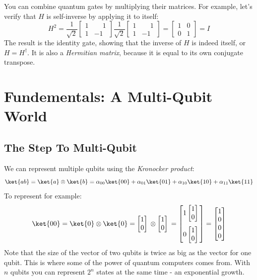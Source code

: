 \documentclass[11pt]{article}
\newcommand{\igate}{
  \begin{bmatrix}
  1 & 0 \\
  0 & 1 
  \end{bmatrix}
}
\newcommand{\hgate}{
  \dfrac{1}{\sqrt2}
  \begin{bmatrix}
  1 & \phantom{-}1 \\
  1 & -1
  \end{bmatrix}
}
\newcommand{\qstatezero}{
  \begin{bmatrix}1 \\ 0\end{bmatrix}
}
\begin{document}
You can combine quantum gates by multiplying their matrices. For example, let's verify that $H$ is self-inverse by applying it to itself:
\[
  H^2 = \hgate{} \hgate{} = \igate{} = I
\]
The result is the identity gate, showing that the inverse of $H$ is indeed itself, or $H = H^\dagger$. It is also a \emph{Hermitian matrix}, because it is equal to its own conjugate transpose.

\newpage

\section{Fundementals: A Multi-Qubit World}
\subsection{The Step To Multi-Qubit}
We can represent multiple qubits using the \emph{Kronocker product}:
\[
  \ket{ab} = \ket{a} \otimes \ket{b} = \alpha_{00}\ket{00} + \alpha_{01}\ket{01} + \alpha_{10}\ket{10} + \alpha_{11}\ket{11}
\]
To represent  for example:
\[
  \ket{00} = \ket{0} \otimes \ket{0} = \qstatezero{} \otimes \qstatezero{} = 
  \begin{bmatrix}
  1\qstatezero{} \\[13pt]
  0\qstatezero{}
  \end{bmatrix}
  =
  \begin{bmatrix}
  1 \\
  0 \\
  0 \\
  0
  \end{bmatrix}
\]
Note that the size of the vector of two qubits is twice as big as the vector for one qubit. This is where some of the power of quantum computers comes from. With $n$ qubits you can represent $2^n$ states at the same time - an exponential growth.
\end{document}
